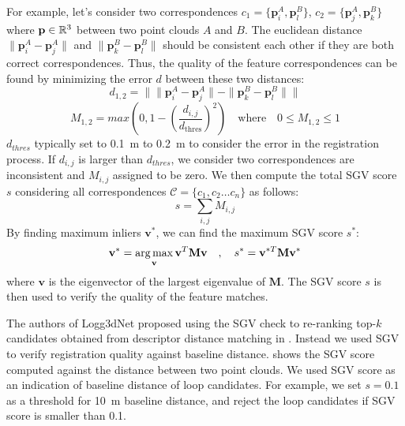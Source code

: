 For example, let's consider two correspondences $c_1 =\{\mathbf{p}_i^{A}, \mathbf{p}_l^{B}\}$, $c_2=\{\mathbf{p}_j^{A}, \mathbf{p}_k^{B}\}$ where $ \mathbf{p}\in \mathbb{R}^{3}$ between two point clouds $A$ and $B$. The euclidean distance $\| \mathbf{p}_i^{A}-\mathbf{p}_j^{A} \|$ and $\| \mathbf{p}_k^{B}-\mathbf{p}_l^{B} \|$ should be consistent each other if they are both correct correspondences. Thus, the quality of the feature correspondences can be found by minimizing the error $d$ between these two distances: 
\begin{equation}
  d_{1,2} = \|\| \mathbf{p}_i^{A}-\mathbf{p}_j^{A} \| - \| \mathbf{p}_k^{B}-\mathbf{p}_l^{B} \| \| 
\end{equation}
\begin{equation}
  M_{1,2} = max( 0 , 1 - \left(\frac{d_{i,j}}{d_{\text{thres}}}\right)^2 ) 
  \quad \text{where} \quad 0 \leq M_{1,2} \leq 1 
\end{equation}
$d_{thres}$ typically set to \SI{0.1}{\meter} to \SI{0.2}{\meter} to consider the error in the registration process. If $d_{i,j}$ is larger than $d_{thres}$, we consider two correspondences are inconsistent and $M_{i,j}$ assigned to be zero.  
We then compute the total SGV score $s$ considering all correspondences $\mathcal{C}=\{c_1, c_2 \ldots c_n\}$ as follows:
\begin{equation}
  s = \sum_{i,j} M_{i,j} 
\end{equation}
By finding maximum inliers $\mathbf{v^{*}}$, we can find the maximum SGV score $s^{*}$: 
\begin{equation}
  \mathbf{v^{*}} = \operatorname*{arg\,max}_{\mathbf{v}} \mathbf{v}^T \mathbf{M} \mathbf{v} \quad, \quad
  s^{*} = \mathbf{v}^{*T} \mathbf{M} \mathbf{v}^{*}
\end{equation}
where $\mathbf{v}$ is the eigenvector of the largest eigenvalue of $\mathbf{M}$. The SGV score $s$ is then used to verify the quality of the feature matches.

The authors of Logg3dNet proposed using the SGV check to re-ranking top-$k$ candidates obtained from descriptor distance matching in . Instead we used SGV to verify registration quality against baseline distance.  shows the SGV score computed against the distance between two point clouds. We used SGV score as an indication of baseline distance of loop candidates. For example, we set $s=0.1$ as a threshold for \SI{10}{\meter} baseline distance, and reject the loop candidates if SGV score is smaller than 0.1.



